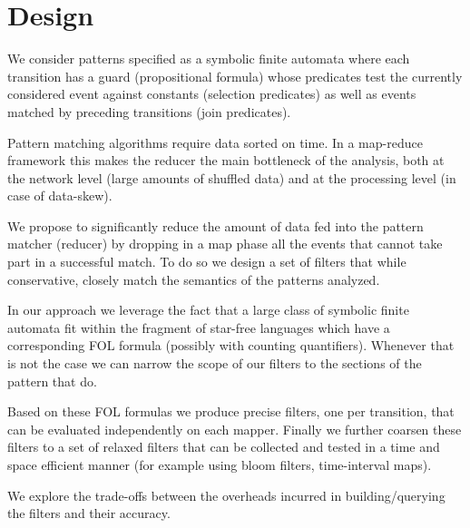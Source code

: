 \section{Design}

We consider patterns specified as a symbolic finite automata where each
transition has a guard (propositional formula) whose predicates test the
currently considered event against constants (selection predicates) as well as
events matched by preceding transitions (join predicates).
   
Pattern matching algorithms require data sorted on time.
In a map-reduce framework this makes the reducer the main bottleneck of the
analysis, both at the network level (large amounts of shuffled data) and at
the processing level (in case of data-skew).



We propose to significantly reduce the amount of data fed into the pattern
matcher (reducer) by dropping in a map phase all the events that cannot take
part in a successful match.
To do so we design a set of filters that while conservative, closely match the
semantics of the patterns analyzed.

\begin{comment}
We propose three levels of abstraction.
The first enforces the join constraints between different transitions as
expressed by join predicates within the transition guards.
The second one further imposes time windowing constraints (all events of a
successful match must occur within a timeout of the first event in the match).
Finally the last one enforces ordering constraints between {\em consecutive}
transitions of the pattern.
\end{comment}

In our approach we leverage the fact that a large class of symbolic finite
automata fit within the fragment of star-free languages which
have a corresponding FOL formula (possibly with counting quantifiers).
Whenever that is not the case we can narrow the scope of our filters to the
sections of the pattern that do.
 
Based on these FOL formulas we produce precise filters, one per transition, 
that can be evaluated independently on each mapper.
Finally we further coarsen these filters to a set of relaxed filters
that can be collected and tested in a time and space efficient manner (for
example using bloom filters, time-interval maps).

We explore the trade-offs between the overheads incurred in building/querying
the filters and their accuracy. 


